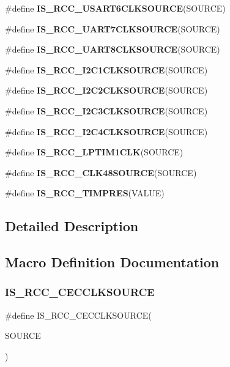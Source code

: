 \begin{DoxyCompactItemize}
\item 
\#define {\bfseries I\+S\+\_\+\+R\+C\+C\+\_\+\+U\+S\+A\+R\+T6\+C\+L\+K\+S\+O\+U\+R\+CE}(S\+O\+U\+R\+CE)
\item 
\#define {\bfseries I\+S\+\_\+\+R\+C\+C\+\_\+\+U\+A\+R\+T7\+C\+L\+K\+S\+O\+U\+R\+CE}(S\+O\+U\+R\+CE)
\item 
\#define {\bfseries I\+S\+\_\+\+R\+C\+C\+\_\+\+U\+A\+R\+T8\+C\+L\+K\+S\+O\+U\+R\+CE}(S\+O\+U\+R\+CE)
\item 
\#define {\bfseries I\+S\+\_\+\+R\+C\+C\+\_\+\+I2\+C1\+C\+L\+K\+S\+O\+U\+R\+CE}(S\+O\+U\+R\+CE)
\item 
\#define {\bfseries I\+S\+\_\+\+R\+C\+C\+\_\+\+I2\+C2\+C\+L\+K\+S\+O\+U\+R\+CE}(S\+O\+U\+R\+CE)
\item 
\#define {\bfseries I\+S\+\_\+\+R\+C\+C\+\_\+\+I2\+C3\+C\+L\+K\+S\+O\+U\+R\+CE}(S\+O\+U\+R\+CE)
\item 
\#define {\bfseries I\+S\+\_\+\+R\+C\+C\+\_\+\+I2\+C4\+C\+L\+K\+S\+O\+U\+R\+CE}(S\+O\+U\+R\+CE)
\item 
\#define {\bfseries I\+S\+\_\+\+R\+C\+C\+\_\+\+L\+P\+T\+I\+M1\+C\+LK}(S\+O\+U\+R\+CE)
\item 
\#define {\bfseries I\+S\+\_\+\+R\+C\+C\+\_\+\+C\+L\+K48\+S\+O\+U\+R\+CE}(S\+O\+U\+R\+CE)
\item 
\#define {\bfseries I\+S\+\_\+\+R\+C\+C\+\_\+\+T\+I\+M\+P\+R\+ES}(V\+A\+L\+UE)
\end{DoxyCompactItemize}


\subsection{Detailed Description}


\subsection{Macro Definition Documentation}
\mbox{\label{group___r_c_c_ex___i_s___r_c_c___definitions_ga007960aa04439c47fd14e2d2226681a5}} 
\subsubsection{\texorpdfstring{IS\_RCC\_CECCLKSOURCE}{IS\_RCC\_CECCLKSOURCE}}
{\footnotesize\ttfamily \#define I\+S\+\_\+\+R\+C\+C\+\_\+\+C\+E\+C\+C\+L\+K\+S\+O\+U\+R\+CE(\begin{DoxyParamCaption}\item[{}]{S\+O\+U\+R\+CE }\end{DoxyParamCaption})}

